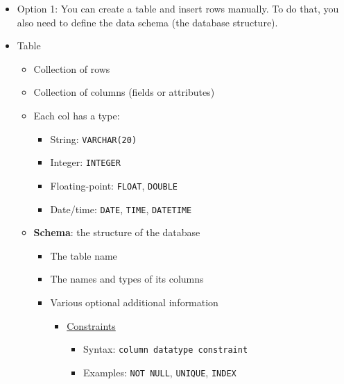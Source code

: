\documentclass[
]{book}
\providecommand{\tightlist}{%
  \setlength{\itemsep}{0pt}\setlength{\parskip}{0pt}}
\begin{document}
\begin{itemize}
\item
  Option 1: You can create a table and insert rows manually. To do that, you also need to define the data schema (the database structure).
\item
  Table

  \begin{itemize}
  \tightlist
  \item
    Collection of rows
  \item
    Collection of columns (fields or attributes)
  \item
    Each col has a type:

    \begin{itemize}
    \tightlist
    \item
      String: \texttt{VARCHAR(20)}
    \item
      Integer: \texttt{INTEGER}
    \item
      Floating-point: \texttt{FLOAT}, \texttt{DOUBLE}
    \item
      Date/time: \texttt{DATE}, \texttt{TIME}, \texttt{DATETIME}
    \end{itemize}
  \item
    \textbf{Schema}: the structure of the database

    \begin{itemize}
    \tightlist
    \item
      The table name
    \item
      The names and types of its columns
    \item
      Various optional additional information

      \begin{itemize}
      \tightlist
      \item
        \href{https://www.w3schools.com/sql/sql_constraints.asp}{Constraints}

        \begin{itemize}
        \tightlist
        \item
          Syntax: \texttt{column\ datatype\ constraint}
        \item
          Examples: \texttt{NOT\ NULL}, \texttt{UNIQUE}, \texttt{INDEX}
        \end{itemize}
      \end{itemize}
    \end{itemize}
  \end{itemize}
\end{itemize}
\end{document}
